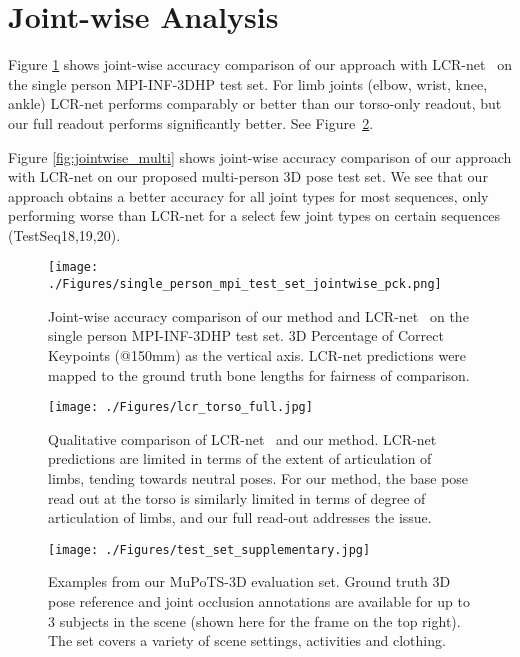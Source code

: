 \section{Joint-wise Analysis}
Figure \ref{fig:jointwise_single} shows joint-wise accuracy comparison of our approach with LCR-net~\cite{rogez_lcr_cvpr17} on the single person MPI-INF-3DHP test set. For limb joints (elbow, wrist, knee, ankle) LCR-net performs comparably or better than our torso-only readout, but our full readout performs significantly better. See Figure~\ref{fig:lcr_torso_full}.

Figure \ref{fig:jointwise_multi} shows joint-wise accuracy comparison of our approach with LCR-net on our proposed multi-person 3D pose test set. We see that our approach obtains a better accuracy for all joint types for most sequences, only performing worse than LCR-net for a select few joint types on certain sequences (TestSeq18,19,20).

\begin{figure}
\centering
  \texttt{[image: ./Figures/single\_person\_mpi\_test\_set\_jointwise\_pck.png]}
  \vspace{-0.4cm}
  \caption
  {Joint-wise accuracy comparison of our method and LCR-net~\cite{rogez_lcr_cvpr17} on the single person MPI-INF-3DHP test set. 3D Percentage of Correct Keypoints (@150mm) as the vertical axis. LCR-net predictions were mapped to the ground truth bone lengths for fairness of comparison.}
  \vspace{-0.3cm}
  \label{fig:jointwise_single}
\end{figure}
\begin{figure}
\centering
  \texttt{[image: ./Figures/lcr\_torso\_full.jpg]}
  \vspace{-0.0cm}
  \caption
  {Qualitative comparison of LCR-net~\cite{rogez_lcr_cvpr17} and our method. LCR-net predictions are limited in terms of the extent of articulation of limbs, tending towards neutral poses. For our method, the base pose read out at the torso is similarly limited in terms of degree of articulation of limbs, and our full read-out addresses the issue. 
  }  
  \label{fig:lcr_torso_full}
  \vspace{-0.0cm}
\end{figure}

\begin{figure}
\centering
  \texttt{[image: ./Figures/test\_set\_supplementary.jpg]}
  \vspace{-0.0cm}
  \caption
  {
  Examples from our MuPoTS-3D evaluation set. Ground truth 3D pose reference and joint occlusion annotations are available for up to 3 subjects in the scene (shown here for the frame on the top right). The set covers a variety of scene settings, activities and clothing.
  }  
  \label{fig:test_set}
  \vspace{-0.5cm}
\end{figure}

